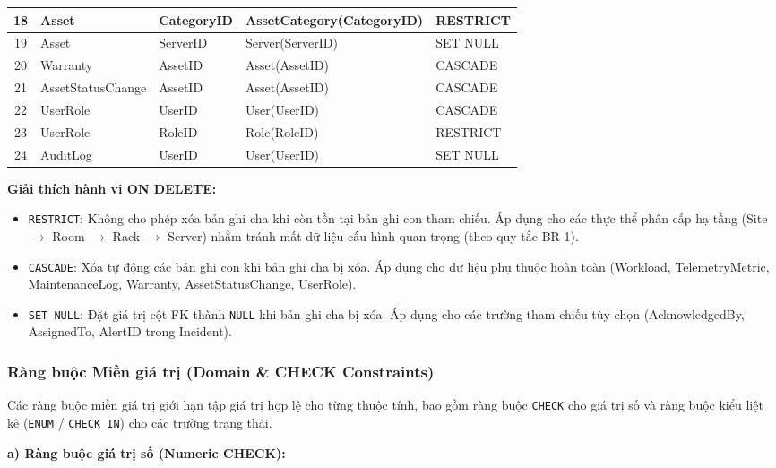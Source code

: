 \begin{longtable}{|c|l|l|l|l|}
18 & Asset & CategoryID & AssetCategory(CategoryID) & RESTRICT \\ \hline
19 & Asset & ServerID & Server(ServerID) & SET NULL \\ \hline
20 & Warranty & AssetID & Asset(AssetID) & CASCADE \\ \hline
21 & AssetStatusChange & AssetID & Asset(AssetID) & CASCADE \\ \hline
22 & UserRole & UserID & User(UserID) & CASCADE \\ \hline
23 & UserRole & RoleID & Role(RoleID) & RESTRICT \\ \hline
24 & AuditLog & UserID & User(UserID) & SET NULL \\ \hline
\end{longtable}

\noindent \textbf{Giải thích hành vi ON DELETE:}
\begin{itemize}[leftmargin=2em]
    \item \texttt{RESTRICT}: Không cho phép xóa bản ghi cha khi còn tồn tại bản ghi con tham chiếu. Áp dụng cho các thực thể phân cấp hạ tầng (Site $\rightarrow$ Room $\rightarrow$ Rack $\rightarrow$ Server) nhằm tránh mất dữ liệu cấu hình quan trọng (theo quy tắc BR-1).
    \item \texttt{CASCADE}: Xóa tự động các bản ghi con khi bản ghi cha bị xóa. Áp dụng cho dữ liệu phụ thuộc hoàn toàn (Workload, TelemetryMetric, MaintenanceLog, Warranty, AssetStatusChange, UserRole).
    \item \texttt{SET NULL}: Đặt giá trị cột FK thành \texttt{NULL} khi bản ghi cha bị xóa. Áp dụng cho các trường tham chiếu tùy chọn (AcknowledgedBy, AssignedTo, AlertID trong Incident).
\end{itemize}

\subsubsection{Ràng buộc Miền giá trị (Domain \& CHECK Constraints)}

Các ràng buộc miền giá trị giới hạn tập giá trị hợp lệ cho từng thuộc tính, bao gồm ràng buộc \texttt{CHECK} cho giá trị số và ràng buộc kiểu liệt kê (\texttt{ENUM} / \texttt{CHECK IN}) cho các trường trạng thái.

\vspace{0.5em}
\noindent\textbf{a) Ràng buộc giá trị số (Numeric CHECK):}

